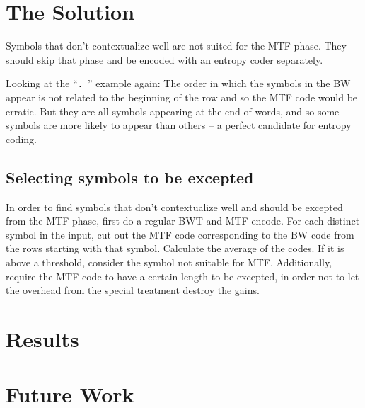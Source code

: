 \documentclass[a4paper]{scrreprt}
\begin{document}
\section{The Solution}

Symbols that don't contextualize well are not suited for the MTF phase. They
should skip that phase and be encoded with an entropy coder separately.

Looking at the ``\texttt{. }'' example again: The order in which the symbols in
the BW appear is not related to the beginning of the row and so the MTF code
would be erratic. But they are all symbols appearing at the end of words, and so
some symbols are more likely to appear than others -- a perfect candidate for
entropy coding.

\subsection{Selecting symbols to be excepted}

In order to find symbols that don't contextualize well and should be excepted
from the MTF phase, first do a regular BWT and MTF encode. For each distinct
symbol in the input, cut out the MTF code corresponding to the BW code from the
rows starting with that symbol. Calculate the average of the codes. If it is
above a threshold, consider the symbol not suitable for MTF. Additionally,
require the MTF code to have a certain length to be excepted, in order not to
let the overhead from the special treatment destroy the gains.

\section{Results}

\section{Future Work}




\end{document}
